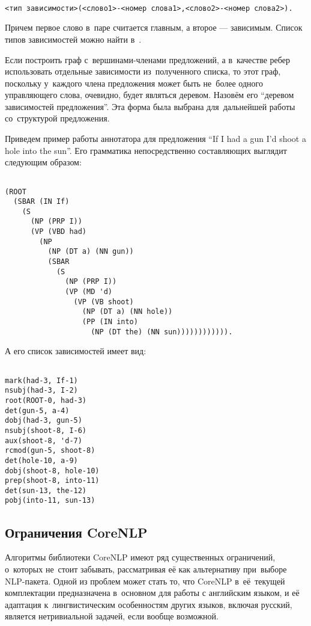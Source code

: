\begin{verbatim}

<тип зависимости>(<слово1>-<номер слова1>,<слово2>-<номер слова2>).

\end{verbatim}

Причем первое слово в~паре считается главным, а второе --- зависимым.
Список типов зависимостей можно найти в~\cite{dependencies}.

Если построить граф с~вершинами-членами предложений, а в~качестве ребер использовать отдельные зависимости из~полученного списка, 
то этот граф, поскольку у~каждого члена предложения может быть не~более одного управляющего слова, 
очевидно, будет являться деревом. 
Назовём его ``деревом зависимостей предложения''.
Эта форма была выбрана для~дальнейшей работы со~структурой предложения.

Приведем пример работы аннотатора для предложения ``If I had a gun I'd shoot a hole into the sun''.
Его грамматика непосредственно составляющих выглядит следующим образом:

\begin{verbatim}

(ROOT
  (SBAR (IN If)
    (S
      (NP (PRP I))
      (VP (VBD had)
        (NP
          (NP (DT a) (NN gun))
          (SBAR
            (S
              (NP (PRP I))
              (VP (MD 'd)
                (VP (VB shoot)
                  (NP (DT a) (NN hole))
                  (PP (IN into)
                    (NP (DT the) (NN sun)))))))))))).

\end{verbatim}

А его список зависимостей имеет вид:

\begin{verbatim}

mark(had-3, If-1)
nsubj(had-3, I-2)
root(ROOT-0, had-3)
det(gun-5, a-4)
dobj(had-3, gun-5)
nsubj(shoot-8, I-6)
aux(shoot-8, 'd-7)
rcmod(gun-5, shoot-8)
det(hole-10, a-9)
dobj(shoot-8, hole-10)
prep(shoot-8, into-11)
det(sun-13, the-12)
pobj(into-11, sun-13)

\end{verbatim}

\subsection{Ограничения CoreNLP}

Алгоритмы библиотеки CoreNLP имеют ряд существенных ограничений, о~которых не~стоит забывать, 
рассматривая её как альтернативу при~выборе NLP-пакета.
Одной из проблем может стать то, что CoreNLP в~её~текущей комплектации
предназначена в~основном для работы с английским языком, 
и её адаптация к~лингвистическим особенностям других языков, включая русский,
является нетривиальной задачей, если вообще возможной.

